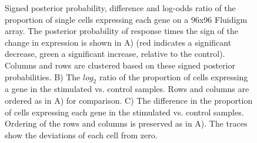 \documentclass[11pt]{article}
\begin{document}
\begin{figure}[htbp]
\centering
{}
\caption{Signed posterior probability, difference and log-odds ratio of the proportion of single cells expressing each gene on a 96x96 Fluidigm array. The posterior probability of response times the sign of the change in expression is shown in A) (red indicates a significant decrease, green a significant increase, relative to the control). Columns and rows are clustered based on these signed posterior probabilities. B) The $log_2$ ratio of the proportion of cells expressing a gene in the stimulated vs. control samples. Rows and columns are ordered as in A) for comparison. C) The difference in the proportion of cells expressing each gene in the stimulated vs. control samples. Ordering of the rows and columns is preserved as in A). The traces show the deviations of each cell from zero.}
\label{fig:fluidigm}
\end{figure}
\end{document}
